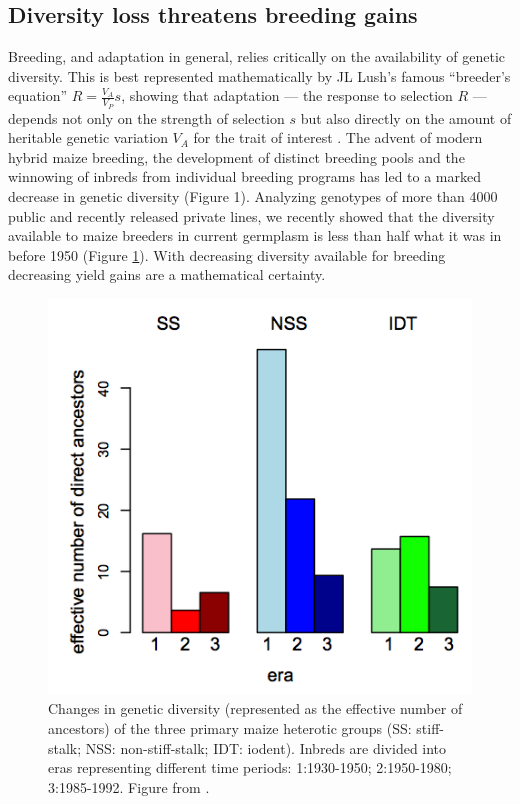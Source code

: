 \documentclass[12pt]{article}
\begin{document}
\subsection*{Diversity loss threatens breeding gains}

Breeding, and adaptation in general, relies critically on the availability of genetic diversity. 
This is best represented mathematically by JL Lush's famous ``breeder's equation'' $R=\frac{V_A}{V_P}s$, showing that adaptation --- the response to selection $R$ --- depends not only on the strength of selection $s$ but also directly on the amount of heritable genetic variation $V_A$ for the trait of interest \citep{kelly2011breeder}. 
The advent of modern hybrid maize breeding, the development of distinct breeding pools and the winnowing of inbreds from individual breeding programs has led to a marked decrease in genetic diversity (Figure 1). 
Analyzing genotypes of more than 4000 public and recently released private lines, we recently showed that the diversity available to maize breeders in current germplasm is less than half what it was in before 1950 (Figure \ref{fig:diversity}). 
With decreasing diversity available for breeding decreasing yield gains are a mathematical certainty. 

\begin{figure}
\includegraphics[width=0.5\linewidth]{joost_diversity.png}
\caption{Changes in genetic diversity (represented as the effective number of ancestors) of the three primary maize heterotic groups (SS: stiff-stalk; NSS: non-stiff-stalk; IDT: iodent). Inbreds are divided into eras representing different time periods: 1:1930-1950; 2:1950-1980; 3:1985-1992. Figure from \citet{van2012historical}.} 
\label{fig:diversity}
\end{figure}
\end{document}
